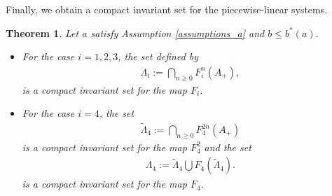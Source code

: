 \documentclass[12pt]{article}
\theoremstyle{plain}
\newtheorem{thm}[defn]{Theorem}
\theoremstyle{remark}
\theoremstyle{definition}
\begin{document}
Finally, we obtain a compact invariant set for the piecewise-linear systems. 
\begin{thm}\label{thm_compactinvregion}
    Let $a$ satisfy Assumption \eqref{assumptions_a} and $b\leq b^*(a)$. 
    \begin{itemize}
        \item For the case $i=1,2,3$, the set defined by
        \begin{align*}
            \Lambda_i:= \bigcap_{n\geq0}F^n_{i}(A_{+}),
        \end{align*}
        is a compact invariant set for the map $F_{i}$.
        \item For the case $i=4$, the set
        \begin{align*}
            \tilde{\Lambda}_4:= \bigcap_{n\geq0}F^{2n}_{4}(A_{+})
        \end{align*}
        is a compact invariant set for the map $F^2_{4}$ and the set
        \begin{align*}
            \Lambda_4:= \tilde{\Lambda}_4 \bigcup F_4\left(\tilde{\Lambda}_4\right).
        \end{align*}
        is a compact invariant set for the map $F_{4}$.
    \end{itemize}
\end{thm}
\end{document}
